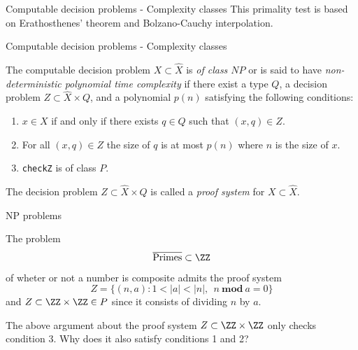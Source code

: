 %

\begin{frame}{Computable decision problems - Complexity classes}
	This primality test is based on Erathosthenes' theorem and Bolzano-Cauchy
	interpolation.

	\bigskip
	
\end{frame}

%

\begin{frame}{Computable decision problems - Complexity classes}
	\begin{defn}
		The computable decision problem $X \subset \hat{X}$ is
		\emph{of class $NP$} or is said to have
		\emph{non-deterministic polynomial time complexity} if there exist
		a type $Q$, a decision problem $Z \subset \hat{X} \times Q$, and a
		polynomial $p(n)$ satisfying the following conditions:
		\begin{enumerate}
			\item $x \in X$ if and only if there exists $q \in Q$ such that
				$(x, q) \in Z$.
			\item For all $(x, q) \in Z$ the size of $q$ is at most $p(n)$
				where $n$ is the size of $x$.
			\item \texttt{checkZ} is of class $P$.
		\end{enumerate}

		The decision problem $Z \subset \hat{X} \times Q$ is called a
		\emph{proof system} for $X \subset \hat{X}$.
	\end{defn}
\end{frame}

%

\begin{frame}{NP problems}
	\begin{exl}
		The problem
		\[
			\overline{\text{Primes}} \subset \ZZ
		\]
		of wheter or not a number is composite admits the proof system
		\[
			Z= \{(n, a) : 1 < |a| < |n|,\ \ n \ 
				\mathbf{mod}\ a = 0\}
		\]
		and
		\(
			Z \subset \ZZ \times \ZZ \in P
		\)
		since it consists of dividing $n$ by $a$.

		\bigskip
		\begin{qsn}
			The above argument about the proof system
			\(
				Z \subset \ZZ \times \ZZ
			\)
			only checks condition 3. Why does it also satisfy conditions 1 and 2? 
		\end{qsn}
	\end{exl}
\end{frame}

